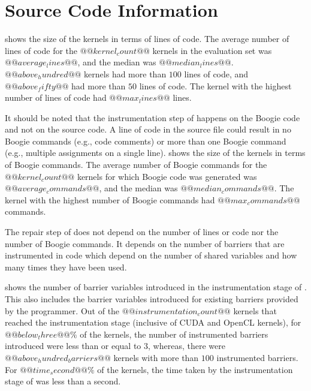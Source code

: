 \section{Source Code Information}

 shows the size of the kernels in terms of lines of code. The average number of lines of code for the $@@kernel_count@@$ kernels in the evaluation set was $@@average_lines@@$, and the median was $@@median_lines@@$. $@@above_hundred@@$ kernels had more than $100$ lines of code, and $@@above_fifty@@$ had more than $50$ lines of code. The kernel with the highest number of lines of code had $@@max_lines@@$ lines.



It should be noted that the instrumentation step of \tool happens on the Boogie code and not on the source code. A line of code in the source file could result in no Boogie commands (e.g., code comments) or more than one Boogie command (e.g., multiple assignments on a single line).  shows the size of the kernels in terms of Boogie commands. The average number of Boogie commands for the $@@kernel_count@@$ kernels for which Boogie code was generated was $@@average_commands@@$, and the median was $@@median_commands@@$. The kernel with the highest number of Boogie commands had $@@max_commands@@$ commands.



The repair step of \tool does not depend on the number of lines or code nor the number of Boogie commands. It depends on the number of barriers that are instrumented in code which depend on the number of shared variables and how many times they have been used.

 shows the number of barrier variables introduced in the instrumentation stage of \tool. This also includes the barrier variables introduced for existing barriers provided by the programmer. Out of the $@@instrumentation_count@@$ kernels that reached the instrumentation stage (inclusive of CUDA and OpenCL kernels), for $@@below_three@@\%$ of the kernels, the number of instrumented barriers introduced were less than or equal to $3$, whereas, there were $@@above_hundred_barriers@@$ kernels with more than $100$ instrumented barriers. For $@@time_second@@\%$ of the kernels, the time taken by the instrumentation stage of \tool was less than a second.
